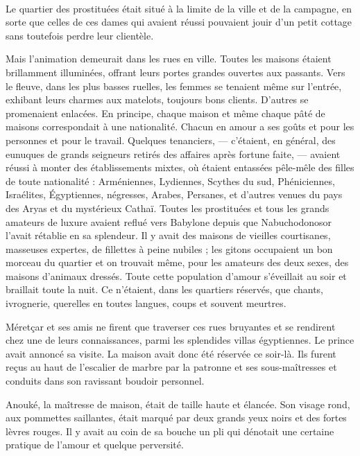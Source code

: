 \documentclass[a4paper, 11pt, oneside, polutonikogreek, french]{article}
\begin{document}
\paragraph{}
Le quartier des prostituées était situé à la limite de la ville et de la campagne, en sorte que celles de ces dames qui avaient réussi pouvaient jouir d'un petit cottage sans toutefois perdre leur clientèle.

Mais l'animation demeurait dans les rues en ville. Toutes les maisons étaient brillamment illuminées, offrant leurs portes grandes ouvertes aux passants. Vers le fleuve, dans les plus basses ruelles, les femmes se tenaient même sur l'entrée, exhibant leurs charmes aux matelots, toujours bons clients. D'autres se promenaient enlacées. En principe, chaque maison et même chaque pâté de maisons correspondait à une nationalité. Chacun en amour a ses goûts et pour les personnes et pour le travail. Quelques tenanciers, --- c'étaient, en général, des eunuques de grands seigneurs retirés des affaires après fortune faite, --- avaient réussi à monter des établissements mixtes, où étaient entassées pêle-mêle des filles de toute nationalité : Arméniennes, Lydiennes, Scythes du sud, Phéniciennes, Israélites, Égyptiennes, négresses, Arabes, Persanes, et d'autres venues du pays des Aryas et du mystérieux Cathaï. Toutes les prostituées et tous les grands amateurs de luxure avaient reflué vers Babylone depuis que Nabuchodonosor l'avait rétablie en sa splendeur. Il y avait des maisons de vieilles courtisanes, masseuses expertes, de fillettes à peine nubiles ; les gitons occupaient un bon morceau du quartier et on trouvait même, pour les amateurs des deux sexes, des maisons d'animaux dressés. Toute cette population d'amour s'éveillait au soir et braillait toute la nuit. Ce n'étaient, dans les quartiers réservés, que chants, ivrognerie, querelles en toutes langues, coups et souvent meurtres.

\bigskip
\centerline{\EightStarTaper}
\centerline{\EightStarTaper\EightStarTaper}
\bigskip

Méretçar et ses amis ne firent que traverser ces rues bruyantes et se rendirent chez une de leurs connaissances, parmi les splendides villas égyptiennes. Le prince avait annoncé sa visite. La maison avait donc été réservée ce soir-là. Ils furent reçus au haut de l'escalier de marbre par la patronne et ses sous-maîtresses et conduits dans son ravissant boudoir personnel.

Anouké, la maîtresse de maison, était de taille haute et élancée. Son visage rond, aux pommettes saillantes, était marqué par deux grands yeux noirs et des fortes lèvres rouges. Il y avait au coin de sa bouche un pli qui dénotait une certaine pratique de l'amour et quelque perversité.
\end{document}

